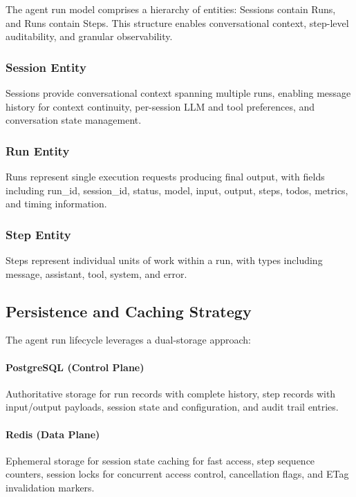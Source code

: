 \documentclass[a4paper,twoside]{sapthesis}
\begin{document}
The agent run model comprises a hierarchy of entities: Sessions contain Runs, and Runs contain Steps. This structure enables conversational context, step-level auditability, and granular observability.

\subsubsection{Session Entity}

Sessions provide conversational context spanning multiple runs, enabling message history for context continuity, per-session LLM and tool preferences, and conversation state management.

\subsubsection{Run Entity}

Runs represent single execution requests producing final output, with fields including run\_id, session\_id, status, model, input, output, steps, todos, metrics, and timing information.

\subsubsection{Step Entity}

Steps represent individual units of work within a run, with types including message, assistant, tool, system, and error.

\subsection{Persistence and Caching Strategy}

The agent run lifecycle leverages a dual-storage approach:

\paragraph{PostgreSQL (Control Plane)} Authoritative storage for run records with complete history, step records with input/output payloads, session state and configuration, and audit trail entries.

\paragraph{Redis (Data Plane)} Ephemeral storage for session state caching for fast access, step sequence counters, session locks for concurrent access control, cancellation flags, and ETag invalidation markers.
\end{document}
